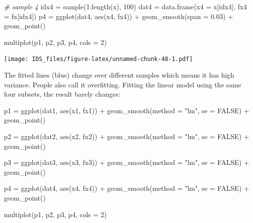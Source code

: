 \documentclass[
  12pt,
]{krantz}
\makeatletter
\newenvironment{Shaded}{\begin{snugshade}}{\end{snugshade}}
\newcommand{\AttributeTok}[1]{\textcolor[rgb]{0.61,0.61,0.61}{#1}}
\newcommand{\CommentTok}[1]{\textcolor[rgb]{0.37,0.37,0.37}{\textit{#1}}}
\newcommand{\ConstantTok}[1]{\textcolor[rgb]{0,0,0}{#1}}
\newcommand{\DecValTok}[1]{\textcolor[rgb]{0.06,0.06,0.06}{#1}}
\newcommand{\FloatTok}[1]{\textcolor[rgb]{0.06,0.06,0.06}{#1}}
\newcommand{\FunctionTok}[1]{\textcolor[rgb]{0,0,0}{#1}}
\newcommand{\NormalTok}[1]{#1}
\newcommand{\OtherTok}[1]{\textcolor[rgb]{0.37,0.37,0.37}{#1}}
\newcommand{\SpecialCharTok}[1]{\textcolor[rgb]{0,0,0}{#1}}
\newcommand{\StringTok}[1]{\textcolor[rgb]{0.5,0.5,0.5}{#1}}
\newenvironment{kframe}{%
\medskip{}
\setlength{\fboxsep}{.8em}
 \def\at@end@of@kframe{}%
 \ifinner\ifhmode%
  \def\at@end@of@kframe{\end{minipage}}%
  \begin{minipage}{\columnwidth}%
 \fi\fi%
 \def\FrameCommand##1{\hskip\@totalleftmargin \hskip-\fboxsep
 \colorbox{shadecolor}{##1}\hskip-\fboxsep
     \hskip-\linewidth \hskip-\@totalleftmargin \hskip\columnwidth}%
 \MakeFramed {\advance\hsize-\width
   \@totalleftmargin\z@ \linewidth\hsize
   \@setminipage}}%
 {\par\unskip\endMakeFramed%
 \at@end@of@kframe}
\renewenvironment{Shaded}{\begin{kframe}}{\end{kframe}}
\makeatother
\begin{document}
\begin{Shaded}
\begin{Highlighting}[]
\CommentTok{\# sample 4}
\NormalTok{idx4 }\OtherTok{=} \FunctionTok{sample}\NormalTok{(}\DecValTok{1}\SpecialCharTok{:}\FunctionTok{length}\NormalTok{(x), }\DecValTok{100}\NormalTok{)}
\NormalTok{dat4 }\OtherTok{=} \FunctionTok{data.frame}\NormalTok{(}\AttributeTok{x4 =}\NormalTok{ x[idx4], }\AttributeTok{fx4 =}\NormalTok{ fx[idx4])}
\NormalTok{p4 }\OtherTok{=} \FunctionTok{ggplot}\NormalTok{(dat4, }\FunctionTok{aes}\NormalTok{(x4, fx4)) }\SpecialCharTok{+} 
  \FunctionTok{geom\_smooth}\NormalTok{(}\AttributeTok{span =} \FloatTok{0.03}\NormalTok{) }\SpecialCharTok{+} 
  \FunctionTok{geom\_point}\NormalTok{()}

\FunctionTok{multiplot}\NormalTok{(p1, p2, p3, p4, }\AttributeTok{cols =} \DecValTok{2}\NormalTok{)}
\end{Highlighting}
\end{Shaded}

\texttt{[image: IDS\_files/figure-latex/unnamed-chunk-48-1.pdf]}

The fitted lines (blue) change over different samples which means it has high variance. People also call it overfitting. Fitting the linear model using the same four subsets, the result barely changes:

\begin{Shaded}
\begin{Highlighting}[]
\NormalTok{p1 }\OtherTok{=} \FunctionTok{ggplot}\NormalTok{(dat1, }\FunctionTok{aes}\NormalTok{(x1, fx1)) }\SpecialCharTok{+} 
  \FunctionTok{geom\_smooth}\NormalTok{(}\AttributeTok{method =} \StringTok{"lm"}\NormalTok{, }\AttributeTok{se =} \ConstantTok{FALSE}\NormalTok{) }\SpecialCharTok{+} 
  \FunctionTok{geom\_point}\NormalTok{()}

\NormalTok{p2 }\OtherTok{=} \FunctionTok{ggplot}\NormalTok{(dat2, }\FunctionTok{aes}\NormalTok{(x2, fx2)) }\SpecialCharTok{+} 
  \FunctionTok{geom\_smooth}\NormalTok{(}\AttributeTok{method =} \StringTok{"lm"}\NormalTok{, }\AttributeTok{se =} \ConstantTok{FALSE}\NormalTok{) }\SpecialCharTok{+} 
  \FunctionTok{geom\_point}\NormalTok{()}

\NormalTok{p3 }\OtherTok{=} \FunctionTok{ggplot}\NormalTok{(dat3, }\FunctionTok{aes}\NormalTok{(x3, fx3)) }\SpecialCharTok{+} 
  \FunctionTok{geom\_smooth}\NormalTok{(}\AttributeTok{method =} \StringTok{"lm"}\NormalTok{, }\AttributeTok{se =} \ConstantTok{FALSE}\NormalTok{) }\SpecialCharTok{+} 
  \FunctionTok{geom\_point}\NormalTok{()}

\NormalTok{p4 }\OtherTok{=} \FunctionTok{ggplot}\NormalTok{(dat4, }\FunctionTok{aes}\NormalTok{(x4, fx4)) }\SpecialCharTok{+} 
  \FunctionTok{geom\_smooth}\NormalTok{(}\AttributeTok{method =} \StringTok{"lm"}\NormalTok{, }\AttributeTok{se =} \ConstantTok{FALSE}\NormalTok{) }\SpecialCharTok{+} 
  \FunctionTok{geom\_point}\NormalTok{()}

\FunctionTok{multiplot}\NormalTok{(p1, p2, p3, p4, }\AttributeTok{cols =} \DecValTok{2}\NormalTok{)}
\end{Highlighting}
\end{Shaded}
\end{document}
